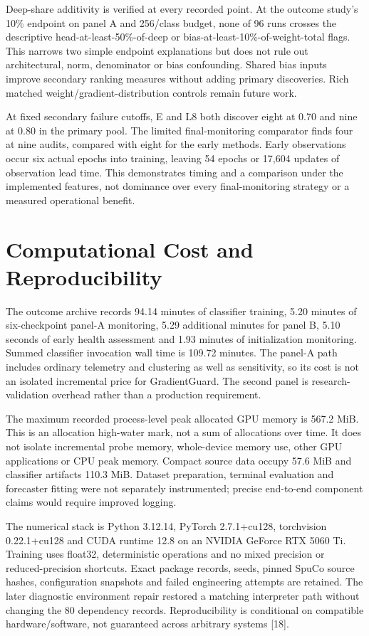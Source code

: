 Deep-share additivity is verified at every recorded point. At the outcome study's 10\% endpoint on panel A and 256/class budget, none of 96 runs crosses the descriptive head-at-least-50\%-of-deep or bias-at-least-10\%-of-weight-total flags. This narrows two simple endpoint explanations but does not rule out architectural, norm, denominator or bias confounding. Shared bias inputs improve secondary ranking measures without adding primary discoveries. Rich matched weight/gradient-distribution controls remain future work.

At fixed secondary failure cutoffs, E and L8 both discover eight at 0.70 and nine at 0.80 in the primary pool. The limited final-monitoring comparator finds four at nine audits, compared with eight for the early methods. Early observations occur six actual epochs into training, leaving 54 epochs or 17,604 updates of observation lead time. This demonstrates timing and a comparison under the implemented features, not dominance over every final-monitoring strategy or a measured operational benefit.

\section{Computational Cost and Reproducibility}
\label{sec:cost}
The outcome archive records 94.14 minutes of classifier training, 5.20 minutes of six-checkpoint panel-A monitoring, 5.29 additional minutes for panel B, 5.10 seconds of early health assessment and 1.93 minutes of initialization monitoring. Summed classifier invocation wall time is 109.72 minutes. The panel-A path includes ordinary telemetry and clustering as well as sensitivity, so its cost is not an isolated incremental price for GradientGuard. The second panel is research-validation overhead rather than a production requirement.

The maximum recorded process-level peak allocated GPU memory is 567.2 MiB. This is an allocation high-water mark, not a sum of allocations over time. It does not isolate incremental probe memory, whole-device memory use, other GPU applications or CPU peak memory. Compact source data occupy 57.6 MiB and classifier artifacts 110.3 MiB. Dataset preparation, terminal evaluation and forecaster fitting were not separately instrumented; precise end-to-end component claims would require improved logging.

The numerical stack is Python 3.12.14, PyTorch 2.7.1+cu128, torchvision 0.22.1+cu128 and CUDA runtime 12.8 on an NVIDIA GeForce RTX 5060 Ti. Training uses float32, deterministic operations and no mixed precision or reduced-precision shortcuts. Exact package records, seeds, pinned SpuCo source hashes, configuration snapshots and failed engineering attempts are retained. The later diagnostic environment repair restored a matching interpreter path without changing the 80 dependency records. Reproducibility is conditional on compatible hardware/software, not guaranteed across arbitrary systems [18].

